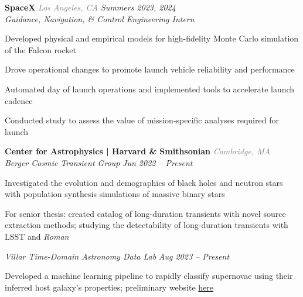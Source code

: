 \documentclass[12pt,letterpaper]{article}
\begin{document}
\textbf{SpaceX} {\small\textit{\textcolor{gray}{Los Angeles, CA} \hfill \textcolor{niceblue}{Summers 2023, 2024}}}\\
\textit{Guidance, Navigation, \& Control Engineering Intern}
\begin{bulletdescription}
      \item
            Developed physical and empirical models for high-fidelity Monte Carlo simulation of the Falcon rocket
      \item
            Drove operational changes to promote launch vehicle reliability and performance
      \item
            Automated day of launch operations and implemented tools to accelerate launch cadence
      \begin{bulletdescription}
            \item
                  Conducted study to assess the value of mission-specific analyses required for launch
      \end{bulletdescription}
\end{bulletdescription}

\vspace{7pt}

\textbf{Center for Astrophysics | Harvard \& Smithsonian} {\small\textit{\textcolor{gray}{Cambridge, MA}}}\\
\textit{Berger Cosmic Transient Group} {\small \textit{\hfill \textcolor{niceblue}{Jun 2022 -- Present}}}
\begin{bulletdescription}
      \item
            Investigated the evolution and demographics of black holes and neutron stars with population synthesis simulations of massive binary stars
      \item
            For senior thesis: created catalog of long-duration transients with novel source extraction methods; studying the detectability of long-duration transients with LSST and \textit{Roman}
\end{bulletdescription}
\textit{Villar Time-Domain Astronomy Data Lab} {\small \textit{\hfill \textcolor{niceblue}{Aug 2023 -- Present}}}
\begin{bulletdescription}
      \item
            Developed a machine learning pipeline to rapidly classify supernovae using their inferred host galaxy's properties; preliminary website \href{http://astrotimelab.com/_pages/splash.html}{here}
\end{bulletdescription}
\end{document}

